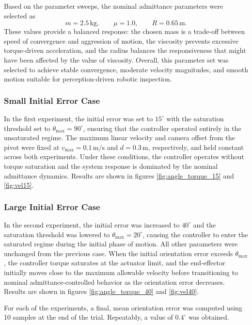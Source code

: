 \documentclass[journal]{IEEEtran}
\begin{document}
Based on the parameter sweeps, the nominal admittance parameters were selected as
\[
m = 2.5\,\mathrm{kg}, \qquad
\mu = 1.0, \qquad
R = 0.65\,\mathrm{m}.
\]
These values provide a balanced response: the chosen mass is a trade-off between speed of convergence and aggression of motion, the viscosity prevents excessive torque-driven acceleration, and the radius balances the responsiveness that might have been affected by the value of viscosity. Overall, this parameter set was selected to achieve stable convergence, moderate velocity magnitudes, and smooth motion suitable for perception-driven robotic inspection.

\subsubsection{Small Initial Error Case}
In the first experiment, the initial error was set to $15^\circ$ with the
saturation threshold set to $\theta_{\max} = 90^\circ$, ensuring that the
controller operated entirely in the unsaturated regime. The maximum linear
velocity and camera offset from the pivot were fixed at
$v_{\max} = 0.1\,\mathrm{m/s}$ and $d = 0.3\,\mathrm{m}$, respectively, and
held constant across both experiments. Under these conditions, the controller
operates without torque saturation and the system response is dominated by the
nominal admittance dynamics. Results are shown in figures \ref{fig:angle_torque_15} and \ref{fig:vel15}.

\subsubsection{Large Initial Error Case}
In the second experiment, the initial error was increased to $40^\circ$ and the
saturation threshold was lowered to $\theta_{\max} = 20^\circ$, causing the
controller to enter the saturated regime during the initial phase of motion.
All other parameters were unchanged from the previous case. When the initial
orientation error exceeds $\theta_{\max}$, the controller torque saturates at
the actuator limit, and the end-effector initially moves close to the maximum
allowable velocity before transitioning to nominal admittance-controlled
behavior as the orientation error decreases. Results are shown in figures \ref{fig:angle_torque_40} and \ref{fig:vel40}.

For each of the experiments, a final, mean orientation error was computed using 10 samples at the end of the trial. Repeatably, a value of $0.4^\circ$ was obtained.
\end{document}
